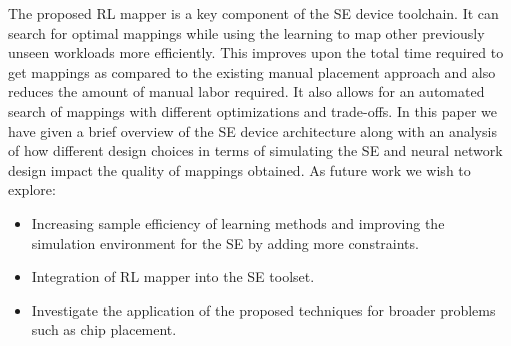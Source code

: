 The proposed RL mapper is a key component of the SE device toolchain.
It can search for optimal mappings while using the learning to map other previously unseen workloads more efficiently.
This improves upon the total time required to get mappings as compared to the existing manual placement approach and also reduces the amount of manual labor required.
It also allows for an automated search of mappings with different optimizations and trade-offs.
In this paper we have given a brief overview of the SE device architecture along with an analysis of how different design choices in terms of simulating the SE and neural network design impact the quality of mappings obtained. As future work we wish to explore:

\begin{itemize}
    \item Increasing sample efficiency of learning methods and improving the simulation environment for the SE by adding more constraints. 
    \item Integration of RL mapper into the SE toolset.
    \item Investigate the application of the proposed techniques for broader problems such as chip placement.
\end{itemize}
